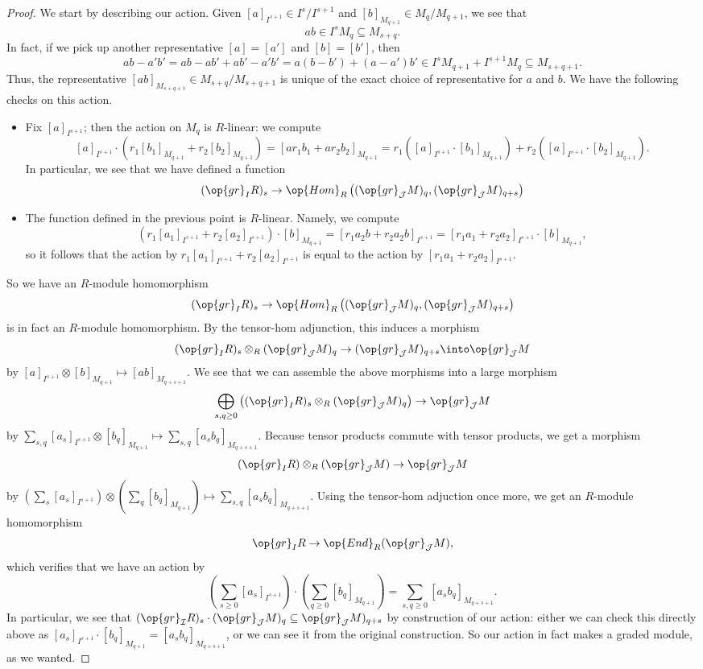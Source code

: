 \begin{proof}
	We start by describing our action. Given $[a]_{I^{s+1}}\in I^s/I^{s+1}$ and $[b]_{M_{q+1}}\in M_q/M_{q+1}$, we see that
	\[ab\in I^sM_q\subseteq M_{s+q}.\]
	In fact, if we pick up another representative $[a]=[a']$ and $[b]=[b']$, then
	\[ab-a'b'=ab-ab'+ab'-a'b'=a(b-b')+(a-a')b'\in I^sM_{q+1}+I^{s+1}M_q\subseteq M_{s+q+1}.\]
	Thus, the representative $[ab]_{M_{s+q+1}}\in M_{s+q}/M_{s+q+1}$ is unique of the exact choice of representative for $a$ and $b$. We have the following checks on this action.
	\begin{itemize}
		\item Fix $[a]_{I^{s+1}}$; then the action on $M_q$ is $R$-linear: we compute
		\[[a]_{I^{s+1}}\cdot\left(r_1[b_1]_{M_{q+1}}+r_2[b_2]_{M_{q+1}}\right)=[ar_1b_1+ar_2b_2]_{M_{q+1}}=r_1\left([a]_{I^{s+1}}\cdot[b_1]_{M_{q+1}}\right)+r_2\left([a]_{I^{s+1}}\cdot[b_2]_{M_{q+1}}\right).\]
		In particular, we see that we have defined a function
		\[(\op{gr}_IR)_s\to\op{Hom}_R\left((\op{gr}_\mathcal JM)_q,(\op{gr}_\mathcal JM)_{q+s}\right)\]
		\item The function defined in the previous point is $R$-linear. Namely, we compute
		\[\left(r_1[a_1]_{I^{s+1}}+r_2[a_2]_{I^{s+1}}\right)\cdot[b]_{M_{q+1}}=[r_1a_2b+r_2a_2b]_{I^{s+1}}=[r_1a_1+r_2a_2]_{I^{s+1}}\cdot[b]_{M_{q+1}},\]
		so it follows that the action by $r_1[a_1]_{I^{s+1}}+r_2[a_2]_{I^{s+1}}$ is equal to the action by $[r_1a_1+r_2a_2]_{I^{s+1}}$.
	\end{itemize}
	So we have an $R$-module homomorphism
	\[(\op{gr}_IR)_s\to\op{Hom}_R\left((\op{gr}_\mathcal JM)_q,(\op{gr}_\mathcal JM)_{q+s}\right)\]
	is in fact an $R$-module homomorphism. By the tensor-hom adjunction, this induces a morphism
	\[(\op{gr}_IR)_s\otimes_R(\op{gr}_\mathcal JM)_q\to(\op{gr}_\mathcal JM)_{q+s}\into\op{gr}_\mathcal JM\]
	by $[a]_{I^{s+1}}\otimes[b]_{M_{q+1}}\mapsto[ab]_{M_{q+s+1}}$. We see that we can assemble the above morphisms into a large morphism
	\[\bigoplus_{s,q\ge0}\left((\op{gr}_IR)_s\otimes_R(\op{gr}_\mathcal JM)_q\right)\to\op{gr}_\mathcal JM\]
	by $\sum_{s,q}[a_s]_{I^{s+1}}\otimes[b_q]_{M_{q+1}}\mapsto\sum_{s,q}[a_sb_q]_{M_{q+s+1}}$. Because tensor products commute with tensor products, we get a morphism
	\[(\op{gr}_IR)\otimes_R(\op{gr}_\mathcal JM)\to\op{gr}_\mathcal JM\]
	by $\left(\sum_s[a_s]_{I^{s+1}}\right)\otimes\left(\sum_q[b_q]_{M_{q+1}}\right)\mapsto\sum_{s,q}[a_sb_q]_{M_{q+s+1}}$. Using the tensor-hom adjuction once more, we get an $R$-module homomorphism
	\[\op{gr}_IR\to\op{End}_R(\op{gr}_\mathcal JM),\]
	which verifies that we have an action by
	\[\left(\sum_{s\ge0}[a_s]_{I^{s+1}}\right)\cdot\left(\sum_{q\ge0}[b_q]_{M_{q+1}}\right)=\sum_{s,q\ge0}[a_sb_q]_{M_{q+s+1}}.\]
	In particular, we see that $(\op{gr}_\mathcal IR)_s\cdot(\op{gr}_\mathcal JM)_q\subseteq\op{gr}_\mathcal JM)_{q+s}$ by construction of our action: either we can check this directly above as $[a_s]_{I^{s+1}}\cdot[b_q]_{M_{q+1}}=[a_sb_q]_{M_{q+s+1}}$, or we can see it from the original construction. So our action in fact makes a graded module, as we wanted.
\end{proof}
